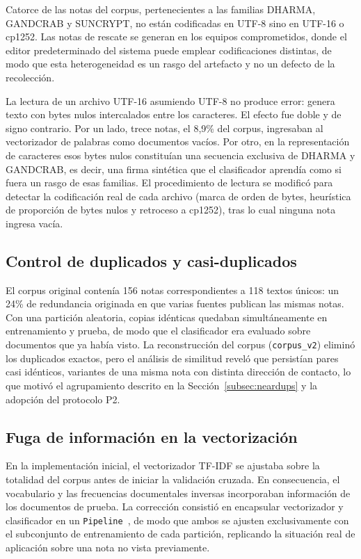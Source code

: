 Catorce de las notas del corpus, pertenecientes a las familias DHARMA, GANDCRAB y SUNCRYPT, no están codificadas en UTF-8 sino en UTF-16 o cp1252. Las notas de rescate se generan en los equipos comprometidos, donde el editor predeterminado del sistema puede emplear codificaciones distintas, de modo que esta heterogeneidad es un rasgo del artefacto y no un defecto de la recolección.

La lectura de un archivo UTF-16 asumiendo UTF-8 no produce error: genera texto con bytes nulos intercalados entre los caracteres. El efecto fue doble y de signo contrario. Por un lado, trece notas, el 8,9\% del corpus, ingresaban al vectorizador de palabras como documentos vacíos. Por otro, en la representación de caracteres esos bytes nulos constituían una secuencia exclusiva de DHARMA y GANDCRAB, es decir, una firma sintética que el clasificador aprendía como si fuera un rasgo de esas familias. El procedimiento de lectura se modificó para detectar la codificación real de cada archivo (marca de orden de bytes, heurística de proporción de bytes nulos y retroceso a cp1252), tras lo cual ninguna nota ingresa vacía.

\subsection{Control de duplicados y casi-duplicados}

El corpus original contenía 156 notas correspondientes a 118 textos únicos: un 24\% de redundancia originada en que varias fuentes publican las mismas notas. Con una partición aleatoria, copias idénticas quedaban simultáneamente en entrenamiento y prueba, de modo que el clasificador era evaluado sobre documentos que ya había visto. La reconstrucción del corpus (\texttt{corpus\_v2}) eliminó los duplicados exactos, pero el análisis de similitud reveló que persistían pares casi idénticos, variantes de una misma nota con distinta dirección de contacto, lo que motivó el agrupamiento descrito en la Sección~\ref{subsec:neardups} y la adopción del protocolo P2.

\subsection{Fuga de información en la vectorización}

En la implementación inicial, el vectorizador TF-IDF se ajustaba sobre la totalidad del corpus antes de iniciar la validación cruzada. En consecuencia, el vocabulario y las frecuencias documentales inversas incorporaban información de los documentos de prueba. La corrección consistió en encapsular vectorizador y clasificador en un \texttt{Pipeline}~\cite{sklearn}, de modo que ambos se ajusten exclusivamente con el subconjunto de entrenamiento de cada partición, replicando la situación real de aplicación sobre una nota no vista previamente.

